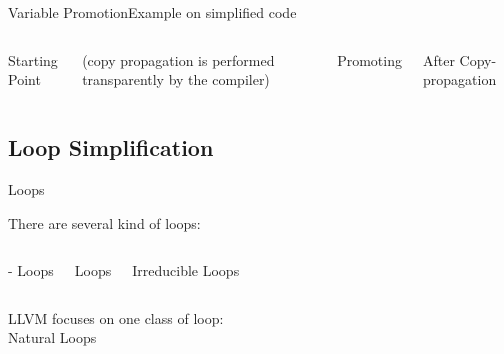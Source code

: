 \begin{frame}{Variable Promotion}{Example on simplified code}
\begin{columns}[t]
\begin{block}{Starting Point}
\end{block}

(copy propagation is performed transparently by the compiler)

\begin{block}{Promoting }
\end{block}

\begin{block}{After Copy-propagation}
\end{block}

\end{columns}
\end{frame}


\subsection{Loop Simplification}


\begin{frame}{Loops}
\begin{center}
There are several kind of loops:

\begin{columns}[t]
\begin{block}{- Loops}
\centering

\end{block}

\begin{block}{ Loops}
\centering

\end{block}

\begin{block}{Irreducible Loops}
\centering

\end{block}
\end{columns}

\bigskip
LLVM focuses on one class of loop:\\
\alert{Natural Loops}
\end{center}
\end{frame}


